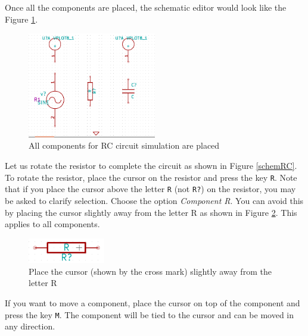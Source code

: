 Once all the components are placed, the schematic editor would look like the Figure \ref{afterplace}.
\begin{figure}
\centering
\includegraphics[width=0.5\textwidth]{figures/afterplace}
\caption{All components for RC circuit simulation are placed}
\label{afterplace}
\end{figure}

Let us rotate the resistor to complete the circuit as shown in Figure \ref{schemRC}. To rotate the resistor, place the cursor on the resistor and press the key {\tt R}. Note that if you place the cursor above the letter {\tt R} (not {\tt R?}) on the resistor, you may be asked to clarify selection. Choose the option \textit{Component R}. You can avoid this by placing the cursor slightly away from the letter R as shown in Figure \ref{rotate}. This applies to all components.
\begin{figure}
\centering
\includegraphics[width=0.3\textwidth]{figures/rotate}
\caption{Place the cursor (shown by the cross mark) slightly away from the letter R}
\label{rotate}
\end{figure}

If you want to move a component, place the cursor on top of the component and press the key {\tt M}. The component will be tied to the cursor and can be moved in any direction. 
